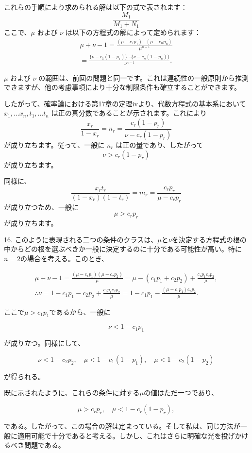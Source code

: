 \documentclass[a4paper,11pt,openany]{ltjsbook}
\begin{document}
これらの手順により求められる解は以下の式で表されます：
\[
\frac{M_1}{M_1 + N_1} \tag{14}
\]
ここで、$\mu$ および $\nu$ は以下の方程式の解によって定められます：
\begin{multline*}
    \mu + \nu - 1
    = \frac{(\mu - c_1 p_1) \dotsm (\mu - c_n p_n)}{\mu^{n-1}} \\
    = \frac{\{\nu - c_1 (1 - p_1)\} \dotsm \{\nu - c_n (1 - p_n)\}}{\nu^{n-1}}.
\tag{15}
\end{multline*}

$\mu$ および $\nu$ の範囲は、前回の問題と同一です。これは連続性の一般原則から推測できますが、他の考慮事項により十分な制限条件も確立することができます。

したがって、確率論における第17章の定理ivより、代数方程式の基本系において $x_1, \dotsc x_n, t_1, \dotsc t_n$ は正の真分数であることが示されます。これにより
\[
    \frac{x_r}{1-x_r} = n_r = \frac{c_r (1-p_r)}{\nu - c_r (1-p_r)}
\]
が成り立ちます。従って、一般に $n_r$ は正の量であり、したがって
\[
    \nu > c_r (1-p_r)
\]
が成り立ちます。

同様に、
\[
    \frac{x_r t_r}{(1-x_r)(1-t_r)} = m_r = \frac{c_r p_r}{\mu - c_r p_r}
\]
が成り立つため、一般に
\[
    \mu > c_r p_r
\]
が成り立ちます。

16. このように表現される二つの条件のクラスは、$\mu$と$\nu$を決定する方程式の根の中からどの根を選ぶべきか一般に決定するのに十分である可能性が高い。特に$n = 2$の場合を考える。このとき、

\begin{gather*}
  \mu + \nu - 1 = \frac{(\mu - c_1 p_1)(\mu - c_2 p_2)}{\mu} 
= \mu - (c_1 p_1 + c_2 p_2) + \frac{c_1 p_1 c_2 p_2}{\mu},
\\
  \therefore\nu = 1 - c_1 p_1 - c_2 p_2 + \frac{c_1 p_1 c_2 p_2}{\mu}
= 1 - c_1 p_1 - \frac{(\mu - c_1 p_1) c_2 p_2}{\mu}.
\end{gather*}

ここで$\mu > c_1 p_1$であるから、一般に

\[
  \nu < 1 - c_1 p_1
\]

が成り立つ。同様にして、

\[
  \nu < 1 - c_2 p_2, \quad
  \mu < 1 - c_1 (1 - p_1), \quad
  \mu < 1 - c_2 (1 - p_2)
\]

が得られる。

既に示されたように、これらの条件に対する$\mu$の値はただ一つであり、

\[
  \mu > c_r p_r, \quad
  \mu < 1 - c_r (1 - p_r),
\]

である。したがって、この場合の解は定まっている。そして私は、同じ方法が一般に適用可能で十分であると考える。しかし、これはさらに明確な光を投げかけるべき問題である。
\end{document}
